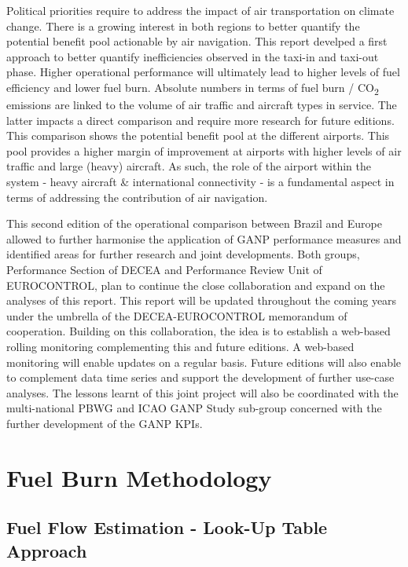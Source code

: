 \documentclass[
  a4paper,
  DIV=11,
  numbers=noendperiod]{scrreprt}
\begin{document}
Political priorities require to address the impact of air transportation
on climate change. There is a growing interest in both regions to better
quantify the potential benefit pool actionable by air navigation. This
report develped a first approach to better quantify inefficiencies
observed in the taxi-in and taxi-out phase. Higher operational
performance will ultimately lead to higher levels of fuel efficiency and
lower fuel burn. Absolute numbers in terms of fuel burn /
CO\textsubscript{2} emissions are linked to the volume of air traffic
and aircraft types in service. The latter impacts a direct comparison
and require more research for future editions. This comparison shows the
potential benefit pool at the different airports. This pool provides a
higher margin of improvement at airports with higher levels of air
traffic and large (heavy) aircraft. As such, the role of the airport
within the system - heavy aircraft \& international connectivity - is a
fundamental aspect in terms of addressing the contribution of air
navigation.

This second edition of the operational comparison between Brazil and
Europe allowed to further harmonise the application of GANP performance
measures and identified areas for further research and joint
developments. Both groups, Performance Section of DECEA and Performance
Review Unit of EUROCONTROL, plan to continue the close collaboration and
expand on the analyses of this report. This report will be updated
throughout the coming years under the umbrella of the DECEA-EUROCONTROL
memorandum of cooperation. Building on this collaboration, the idea is
to establish a web-based rolling monitoring complementing this and
future editions. A web-based monitoring will enable updates on a regular
basis. Future editions will also enable to complement data time series
and support the development of further use-case analyses. The lessons
learnt of this joint project will also be coordinated with the
multi-national PBWG and ICAO GANP Study sub-group concerned with the
further development of the GANP KPIs.

\appendix
{}

\hypertarget{fuel-burn-methodology}{%
\chapter{Fuel Burn Methodology}\label{fuel-burn-methodology}}

\hypertarget{fuel-flow-estimation---look-up-table-approach}{%
\section{Fuel Flow Estimation - Look-Up Table
Approach}\label{fuel-flow-estimation---look-up-table-approach}}
\end{document}
